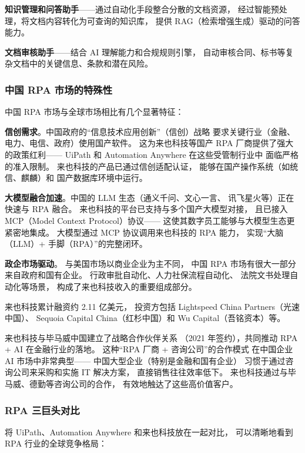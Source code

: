 \textbf{知识管理和问答助手}——通过自动化手段整合分散的文档资源，
经过智能预处理，将文档内容转化为可查询的知识库，
提供 RAG（检索增强生成）驱动的问答能力。

\textbf{文档审核助手}——结合 AI 理解能力和合规规则引擎，
自动审核合同、标书等复杂文档中的关键信息、条款和潜在风险。

\subsubsection{中国 RPA 市场的特殊性}

中国 RPA 市场与全球市场相比有几个显著特征：

\textbf{信创需求}。中国政府的``信息技术应用创新''（信创）战略
要求关键行业（金融、电力、电信、政府）使用国产软件。
这为来也科技等国产 RPA 厂商提供了强大的政策红利——
UiPath 和 Automation Anywhere 在这些受管制行业中
面临严格的准入限制。
来也科技的产品已通过信创适配认证，
能够在国产操作系统（如统信、麒麟）和
国产数据库环境中运行。

\textbf{大模型融合加速}。中国的 LLM 生态（通义千问、文心一言、
讯飞星火等）正在快速与 RPA 融合。
来也科技的平台已支持与多个国产大模型对接，
且已接入 MCP（Model Context Protocol）协议——
这使其数字员工能够与大模型生态更紧密地集成。
大模型通过 MCP 协议调用来也科技的 RPA 能力，
实现``大脑（LLM）+ 手脚（RPA）''的完整闭环。

\textbf{政企市场驱动}。
与美国市场以商业企业为主不同，
中国 RPA 市场有很大一部分来自政府和国有企业。
行政审批自动化、人力社保流程自动化、
法院文书处理自动化等场景，
构成了来也科技收入的重要组成部分。

来也科技累计融资约 2.11 亿美元，
投资方包括 Lightspeed China Partners（光速中国）、
Sequoia Capital China（红杉中国）和 Wu Capital（吾铭资本）等。

来也科技与毕马威中国建立了战略合作伙伴关系
（2021 年签约），共同推动 RPA + AI 在金融行业的落地。
这种``RPA 厂商 + 咨询公司''的合作模式
在中国企业 AI 市场中非常典型——
中国大型企业（特别是金融和国有企业）
习惯于通过咨询公司来采购和实施 IT 解决方案，
直接销售往往效率低下。
来也科技通过与毕马威、德勤等咨询公司的合作，
有效地触达了这些高价值客户。

\subsubsection{RPA 三巨头对比}

将 UiPath、Automation Anywhere 和来也科技放在一起对比，
可以清晰地看到 RPA 行业的全球竞争格局：

